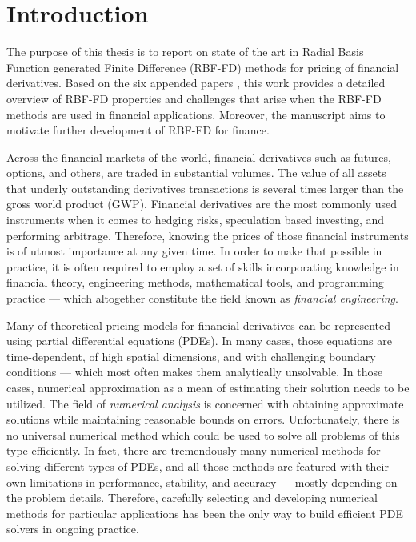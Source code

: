 \documentclass{UUThesisTemplate}
\begin{document}
\chapter{Introduction}
\label{ch:introduction}
\par The purpose of this thesis is to report on state of the art in Radial Basis Function generated Finite Difference (RBF-FD) methods for pricing of financial derivatives. Based on the six appended papers \cite{paper1,paper2,paper3,paper4,paper5,paper6}, this work provides a detailed overview of RBF-FD properties and challenges that arise when the RBF-FD methods are used in financial applications. Moreover, the manuscript aims to motivate further development of RBF-FD for finance.
\par Across the financial markets of the world, financial derivatives such as futures, options, and others, are traded in substantial volumes. The value of all assets that underly outstanding derivatives transactions is several times larger than the gross world product (GWP). Financial derivatives are the most commonly used instruments when it comes to hedging risks, speculation based investing, and performing arbitrage. Therefore, knowing the prices of those financial instruments is of utmost importance at any given time. In order to make that possible in practice, it is often required to employ a set of skills incorporating knowledge in financial theory, engineering methods, mathematical tools, and programming practice --- which altogether constitute the field known as \emph{financial engineering}. 
\par Many of theoretical pricing models for financial derivatives can be represented using partial differential equations (PDEs). In many cases, those equations are time-dependent, of high spatial dimensions, and with challenging boundary conditions --- which most often makes them analytically unsolvable. In those cases, numerical approximation as a mean of estimating their solution needs to be utilized. The field of \emph{numerical analysis} is concerned with obtaining approximate solutions while maintaining reasonable bounds on errors. Unfortunately, there is no universal numerical method which could be used to solve all problems of this type efficiently. In fact, there are tremendously many numerical methods for solving different types of PDEs, and all those methods are featured with their own limitations in performance, stability, and accuracy --- mostly depending on the problem details. Therefore, carefully selecting and developing numerical methods for particular applications has been the only way to build efficient PDE solvers in ongoing practice. 
\end{document}
